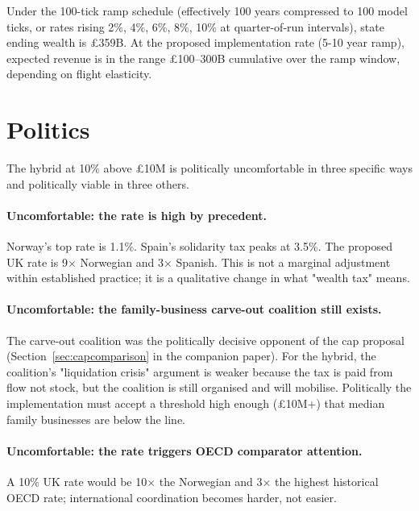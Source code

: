 \documentclass[11pt]{article}
\begin{document}
Under the 100-tick ramp schedule (effectively 100 years compressed
to 100 model ticks, or rates rising 2\%, 4\%, 6\%, 8\%, 10\% at
quarter-of-run intervals), state ending wealth is \pounds 359B.
At the proposed implementation rate (5-10 year ramp), expected
revenue is in the range \pounds 100--300B cumulative over the
ramp window, depending on flight elasticity.

\section{Politics}
\label{sec:politics}

The hybrid at 10\% above \pounds 10M is politically uncomfortable
in three specific ways and politically viable in three others.

\paragraph{Uncomfortable: the rate is high by precedent.}  Norway's
top rate is 1.1\%.  Spain's solidarity tax peaks at 3.5\%.  The
proposed UK rate is 9$\times$ Norwegian and 3$\times$ Spanish.  This
is not a marginal adjustment within established practice; it is a
qualitative change in what "wealth tax" means.

\paragraph{Uncomfortable: the family-business carve-out coalition
still exists.}  The carve-out coalition was the politically
decisive opponent of the cap proposal (Section~\ref{sec:capcomparison}
in the companion paper).  For the hybrid, the coalition's
"liquidation crisis" argument is weaker because the tax is paid
from flow not stock, but the coalition is still organised and
will mobilise.  Politically the implementation must accept a
threshold high enough (\pounds 10M+) that median family businesses
are below the line.

\paragraph{Uncomfortable: the rate triggers OECD comparator
attention.}  A 10\% UK rate would be 10$\times$ the Norwegian and
3$\times$ the highest historical OECD rate; international
coordination becomes harder, not easier.
\end{document}

